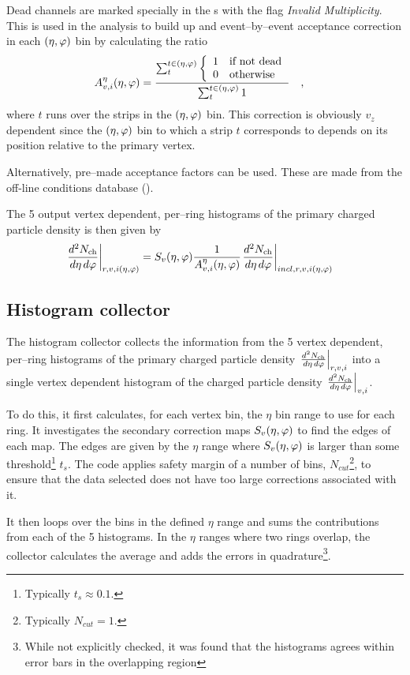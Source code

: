 \documentclass[11pt]{article}
\begin{document}
Dead channels are marked specially in the \ESD{}s with the flag
\textit{Invalid Multiplicity}.  This is used in the analysis to build
up and event--by--event acceptance correction in each $(\eta,\varphi)$
bin by calculating the ratio
\begin{align}
  \label{eq:dead_channels} 
  A^{\eta}_{v,i}(\eta,\varphi){} &= 
  \frac{\sum_t^{t\in(\eta,\varphi)}\left\{\begin{array}{cl}
        1 & \text{if not dead}\\
        0 & \text{otherwise}
      \end{array}\right.}{\sum_t^{t\in(\eta,\varphi)} 1}\quad,
\end{align}
where $t$ runs over the strips in the $(\eta,\varphi)$ bin.  This correction
is obviously $v_z$ dependent since the $(\eta,\varphi)$ bin to which a strip $t$
corresponds to depends on its  position relative to the primary vertex.

Alternatively, pre--made acceptance factors can be used.  These are
made from the off-line conditions database (\OCDB{}).

The 5 output vertex dependent, per--ring histograms of the primary
charged particle density is then given by
\begin{align}
  \dndetadphi[r,v,i\etaphi] &=
  \SecMap{} \frac{1}{\DeadCh{}}\dndetadphi[incl,r,v,i\etaphi]
\end{align}

\subsection{Histogram collector}
\label{sec:sub:hist_collector}

The histogram collector collects the information from the 5 vertex
dependent, per--ring histograms of the primary charged particle
density $\dndetadphi[r,v,i]$ into a single vertex dependent histogram
of the charged particle density $\dndetadphi[v,i]$.  

To do this, it first calculates, for each vertex bin, the $\eta$ bin
range to use for each ring.  It investigates the secondary correction
maps $S_v(\eta,\varphi){}$ to find the edges of each map.  The edges are given
by the $\eta$ range where $S_v(\eta,\varphi){}$ is larger than some
threshold\footnote{Typically $t_s\approx 0.1$.}  $t_s$. The code
applies safety margin of a number of bins, $N_{cut}$\footnote{Typically
  $N_{cut}=1$.}, to ensure that the data selected does not have too
large corrections associated with it.

It then loops over the bins in the defined $\eta$ range and sums the
contributions from each of the 5 histograms.  In the $\eta$ ranges
where two rings overlap, the collector calculates the average and adds
the errors in quadrature\footnote{While not explicitly checked, it was
  found that the histograms agrees within error bars in the
  overlapping region}.
\end{document}
